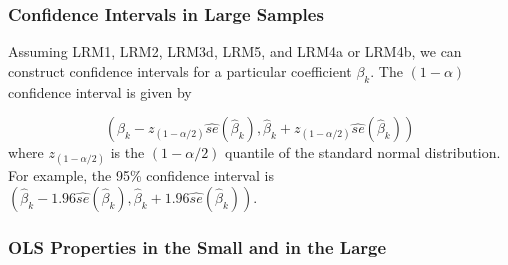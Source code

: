 \documentclass[a4paper,12pt]{article}
\begin{document}
\subsubsection*{Confidence Intervals in Large Samples}


Assuming LRM1,  LRM2,  LRM3d,  LRM5,  and LRM4a or LRM4b,  we can construct confidence intervals for a particular coefficient $\beta_k$.  The $(1 - \alpha)$ confidence interval is given by

$$\left(\hat{\beta}_k-z_{(1-\alpha/2)}\widehat{se}(\hat{\beta}_k), \hat{\beta}_k+z_{(1-\alpha/2)}\widehat{se}(\hat{\beta}_k)\right)$$
where $z_{(1-\alpha/2)}$ is the $(1 - \alpha/2)$ quantile of the standard normal distribution.\\[2ex]

For example, the 95\% confidence interval is $\left(\hat{\beta}_k-1.96\widehat{se}(\hat{\beta}_k), \hat{\beta}_k+1.96\widehat{se}(\hat{\beta}_k)\right)$.





\subsubsection*{OLS Properties in the Small and in the Large}
\end{document}
